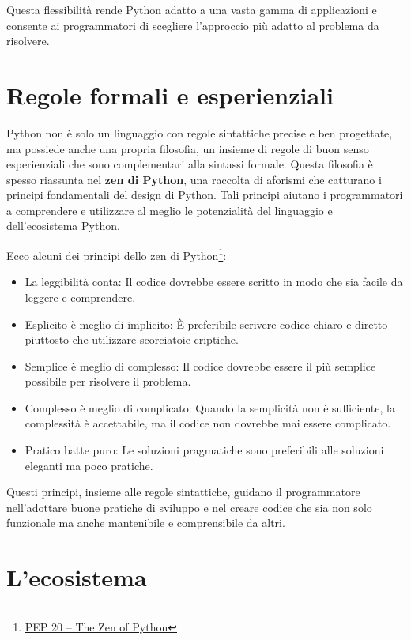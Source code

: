 \documentclass[
  letterpaper,
]{scrbook}
\providecommand{\tightlist}{%
  \setlength{\itemsep}{0pt}\setlength{\parskip}{0pt}}\usepackage{longtable,booktabs,array}
\begin{document}
Questa flessibilità rende Python adatto a una vasta gamma di
applicazioni e consente ai programmatori di scegliere l'approccio più
adatto al problema da risolvere.

\section{Regole formali e
esperienziali}\label{regole-formali-e-esperienziali}

Python non è solo un linguaggio con regole sintattiche precise e ben
progettate, ma possiede anche una propria filosofia, un insieme di
regole di buon senso esperienziali che sono complementari alla sintassi
formale. Questa filosofia è spesso riassunta nel \textbf{zen di Python},
una raccolta di aforismi che catturano i principi fondamentali del
design di Python. Tali principi aiutano i programmatori a comprendere e
utilizzare al meglio le potenzialità del linguaggio e dell'ecosistema
Python.

Ecco alcuni dei principi dello zen di Python\footnote{\href{https://peps.python.org/pep-0020/}{PEP
  20 -- The Zen of Python}}:

\begin{itemize}
\tightlist
\item
  La leggibilità conta: Il codice dovrebbe essere scritto in modo che
  sia facile da leggere e comprendere.
\item
  Esplicito è meglio di implicito: È preferibile scrivere codice chiaro
  e diretto piuttosto che utilizzare scorciatoie criptiche.
\item
  Semplice è meglio di complesso: Il codice dovrebbe essere il più
  semplice possibile per risolvere il problema.
\item
  Complesso è meglio di complicato: Quando la semplicità non è
  sufficiente, la complessità è accettabile, ma il codice non dovrebbe
  mai essere complicato.
\item
  Pratico batte puro: Le soluzioni pragmatiche sono preferibili alle
  soluzioni eleganti ma poco pratiche.
\end{itemize}

Questi principi, insieme alle regole sintattiche, guidano il
programmatore nell'adottare buone pratiche di sviluppo e nel creare
codice che sia non solo funzionale ma anche mantenibile e comprensibile
da altri.

\section{L'ecosistema}\label{lecosistema}
\end{document}
